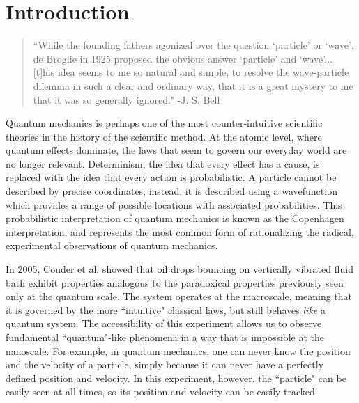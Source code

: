 		
\chapter*{Introduction}
\begin{quote}
	    ``While the founding fathers agonized over the question `particle' or `wave', de Broglie in 1925 proposed the obvious answer `particle' and `wave'... [t]his idea seems to me so natural and simple, to resolve the wave-particle dilemma in such a clear and ordinary way, that it is a great mystery to me that it was so generally ignored." -J. S. Bell
	    \end{quote}
	    

	    


Quantum mechanics is perhaps one of the most counter-intuitive scientific theories in the history of the scientific method. At the atomic level, where quantum effects dominate, the laws that seem to govern our everyday world are no longer relevant. Determinism, the idea that every effect has a cause, is replaced with the idea that every action is probabilistic. A particle cannot be described by precise coordinates; instead, it is described using a wavefunction which provides a range of possible locations with associated probabilities. This probabilistic interpretation of quantum mechanics is known as the Copenhagen interpretation, and represents the most common form of rationalizing the radical, experimental observations of quantum mechanics. 

In 2005, Couder et al. showed that oil drops bouncing on vertically vibrated fluid bath exhibit properties analogous to the paradoxical properties previously seen only at the quantum scale.  The system operates at the macroscale, meaning that it is governed by the more ``intuitive" classical laws, but still behaves \textit{like} a quantum system. The accessibility of this experiment allows us to observe fundamental ``quantum"-like phenomena in a way that is impossible at the nanoscale. For example, in quantum mechanics, one can never know the position and the velocity of a particle, simply because it can never have a perfectly defined position and velocity. In this experiment, however, the ``particle" can be easily seen at all times, so its position and velocity can be easily tracked. 

